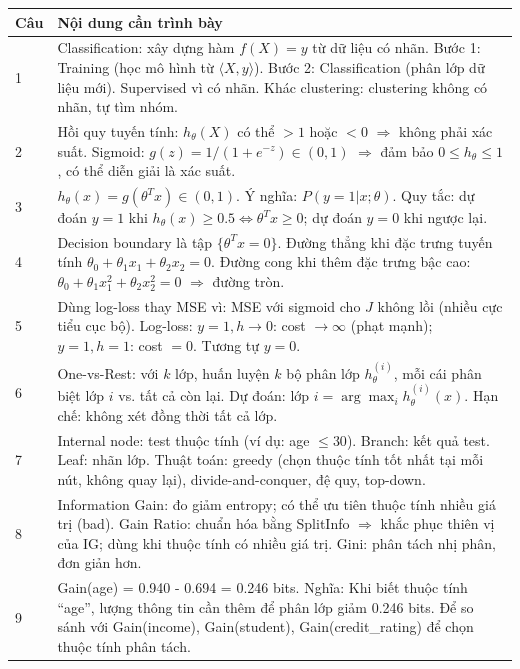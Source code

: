 \documentclass[10pt]{article}
\begin{document}
\begin{singlespace}
\begin{longtable}{|p{}|p{}|}
\hline
\textbf{Câu} & \textbf{Nội dung cần trình bày} \\
\hline
\endhead
1 & Classification: xây dựng hàm $f(X) = y$ từ dữ liệu có nhãn. Bước 1: Training (học mô hình từ $\langle X, y \rangle$). Bước 2: Classification (phân lớp dữ liệu mới). Supervised vì có nhãn. Khác clustering: clustering không có nhãn, tự tìm nhóm. \\
\hline
2 & Hồi quy tuyến tính: $h_\theta(X)$ có thể $> 1$ hoặc $< 0$ $\Rightarrow$ không phải xác suất. Sigmoid: $g(z) = 1/(1+e^{-z}) \in (0,1)$ $\Rightarrow$ đảm bảo $0 \leq h_\theta \leq 1$, có thể diễn giải là xác suất. \\
\hline
3 & $h_\theta(x) = g(\theta^Tx) \in (0,1)$. Ý nghĩa: $P(y=1|x;\theta)$. Quy tắc: dự đoán $y=1$ khi $h_\theta(x) \geq 0.5 \Leftrightarrow \theta^Tx \geq 0$; dự đoán $y=0$ khi ngược lại. \\
\hline
4 & Decision boundary là tập $\{\theta^Tx = 0\}$. Đường thẳng khi đặc trưng tuyến tính $\theta_0 + \theta_1 x_1 + \theta_2 x_2 = 0$. Đường cong khi thêm đặc trưng bậc cao: $\theta_0 + \theta_1 x_1^2 + \theta_2 x_2^2 = 0$ $\Rightarrow$ đường tròn. \\
\hline
5 & Dùng log-loss thay MSE vì: MSE với sigmoid cho $J$ không lồi (nhiều cực tiểu cục bộ). Log-loss: $y=1, h \to 0$: cost $\to \infty$ (phạt mạnh); $y=1, h=1$: cost $= 0$. Tương tự $y=0$. \\
\hline
6 & One-vs-Rest: với $k$ lớp, huấn luyện $k$ bộ phân lớp $h_\theta^{(i)}$, mỗi cái phân biệt lớp $i$ vs. tất cả còn lại. Dự đoán: lớp $i = \arg\max_i h_\theta^{(i)}(x)$. Hạn chế: không xét đồng thời tất cả lớp. \\
\hline
7 & Internal node: test thuộc tính (ví dụ: age $\leq 30$). Branch: kết quả test. Leaf: nhãn lớp. Thuật toán: greedy (chọn thuộc tính tốt nhất tại mỗi nút, không quay lại), divide-and-conquer, đệ quy, top-down. \\
\hline
8 & Information Gain: đo giảm entropy; có thể ưu tiên thuộc tính nhiều giá trị (bad). Gain Ratio: chuẩn hóa bằng SplitInfo $\Rightarrow$ khắc phục thiên vị của IG; dùng khi thuộc tính có nhiều giá trị. Gini: phân tách nhị phân, đơn giản hơn. \\
\hline
9 & Gain(age) = 0.940 - 0.694 = 0.246 bits. Nghĩa: Khi biết thuộc tính ``age'', lượng thông tin cần thêm để phân lớp giảm 0.246 bits. Để so sánh với Gain(income), Gain(student), Gain(credit\_rating) để chọn thuộc tính phân tách. \\

\end{longtable}
\end{singlespace}
\end{document}
